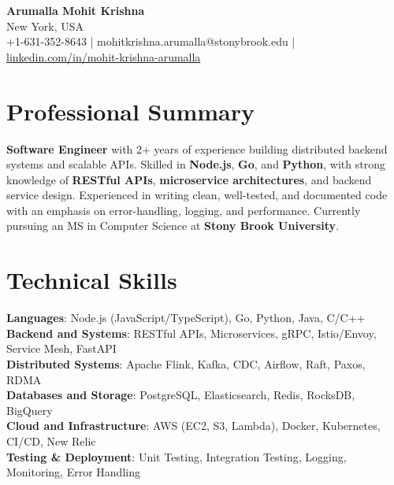 \documentclass[letterpaper,11pt]{article}
\begin{document}
\begin{center}
  {\Large \textbf{Arumalla Mohit Krishna}} \\
  New York, USA \\
  +1-631-352-8643 \enspace | \enspace mohitkrishna.arumalla@stonybrook.edu \enspace | \enspace \href{https://www.linkedin.com/in/mohit-krishna-arumalla}{linkedin.com/in/mohit-krishna-arumalla}
\end{center}

\section{Professional Summary}
  \begin{itemize}[leftmargin=0.15in, label={}]
    \small{\item{
     \textbf{Software Engineer} with 2+ years of experience building distributed backend systems and scalable APIs. Skilled in \textbf{Node.js}, \textbf{Go}, and \textbf{Python}, with strong knowledge of \textbf{RESTful APIs}, \textbf{microservice architectures}, and backend service design. Experienced in writing clean, well-tested, and documented code with an emphasis on error-handling, logging, and performance. Currently pursuing an MS in Computer Science at \textbf{Stony Brook University}.
    }}
  \end{itemize}
\vspace{-16pt}

\section{Technical Skills}
 \begin{itemize}[leftmargin=0.15in, label={}]
    \small{\item{
     \textbf{Languages}: Node.js (JavaScript/TypeScript), Go, Python, Java, C/C++ \\
     \textbf{Backend and Systems}: RESTful APIs, Microservices, gRPC, Istio/Envoy, Service Mesh, FastAPI \\
     \textbf{Distributed Systems}: Apache Flink, Kafka, CDC, Airflow, Raft, Paxos, RDMA \\
     \textbf{Databases and Storage}: PostgreSQL, Elasticsearch, Redis, RocksDB, BigQuery \\
     \textbf{Cloud and Infrastructure}: AWS (EC2, S3, Lambda), Docker, Kubernetes, CI/CD, New Relic \\
     \textbf{Testing \& Deployment}: Unit Testing, Integration Testing, Logging, Monitoring, Error Handling
    }}
 \end{itemize}
\vspace{-16pt}
\end{document}
